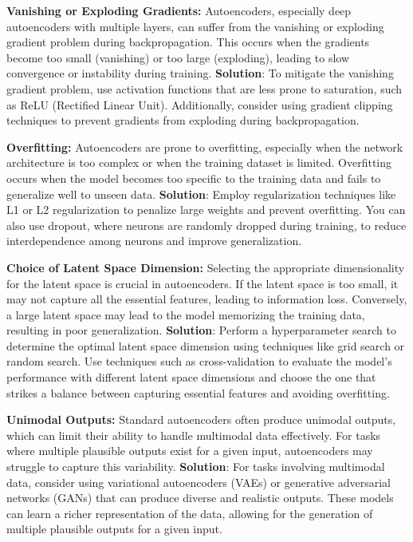 \begin{list}{}{}
    \item \textbf{Vanishing or Exploding Gradients:}
    Autoencoders, especially deep autoencoders with multiple layers, can suffer from the vanishing or exploding gradient problem during backpropagation. This occurs when the gradients become too small (vanishing) or too large (exploding), leading to slow convergence or instability during training. \textbf{Solution}: To mitigate the vanishing gradient problem, use activation functions that are less prone to saturation, such as ReLU (Rectified Linear Unit). Additionally, consider using gradient clipping techniques to prevent gradients from exploding during backpropagation.
    
    \item \textbf{Overfitting:}
    Autoencoders are prone to overfitting, especially when the network architecture is too complex or when the training dataset is limited. Overfitting occurs when the model becomes too specific to the training data and fails to generalize well to unseen data. \textbf{Solution}: Employ regularization techniques like L1 or L2 regularization to penalize large weights and prevent overfitting. You can also use dropout, where neurons are randomly dropped during training, to reduce interdependence among neurons and improve generalization.
    
    \item \textbf{Choice of Latent Space Dimension:}
    Selecting the appropriate dimensionality for the latent space is crucial in autoencoders. If the latent space is too small, it may not capture all the essential features, leading to information loss. Conversely, a large latent space may lead to the model memorizing the training data, resulting in poor generalization. \textbf{Solution}: Perform a hyperparameter search to determine the optimal latent space dimension using techniques like grid search or random search. Use techniques such as cross-validation to evaluate the model's performance with different latent space dimensions and choose the one that strikes a balance between capturing essential features and avoiding overfitting.
    
    \item \textbf{Unimodal Outputs:}
    Standard autoencoders often produce unimodal outputs, which can limit their ability to handle multimodal data effectively. For tasks where multiple plausible outputs exist for a given input, autoencoders may struggle to capture this variability. \textbf{Solution}: For tasks involving multimodal data, consider using variational autoencoders (VAEs) or generative adversarial networks (GANs) that can produce diverse and realistic outputs. These models can learn a richer representation of the data, allowing for the generation of multiple plausible outputs for a given input.
    

\end{list}
